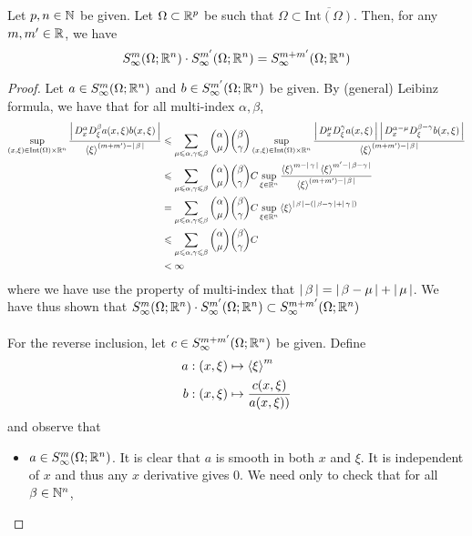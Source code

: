 \documentclass[12pt]{article}
\begin{document}
\begin{fprop}
    Let $p, n \in \N$ be given. Let $\Omega \subset \R^p$ be such that $\Omega \subset \overline{\mathrm{Int}(\Omega)}$. Then, for any $m, m' \in \R$, we have 
    \[
    S^{m}_\infty(\Omega; \R^n) \cdot S^{m'}_\infty(\Omega; \R^n) = S^{m + m'}_\infty(\Omega; \R^n)
    \]
\end{fprop}
\begin{proof}
    Let $a \in S^{m}_\infty(\Omega; \R^n)$ and $b \in S^{m'}_\infty(\Omega; \R^n)$ be given. By (general) Leibinz formula, we have that for all multi-index $\alpha, \beta$, 
    \begin{align*}
    \sup_{(x, \xi) \in \mathrm{Int}(\Omega) \times \R^n} \frac{\abs{D^\alpha_x D^\beta_\xi a(x, \xi)b(x, \xi)}}{\sym[\xi]^{(m + m') - \abs{\beta}}} 
    &\leq  \sum_{\mu \leq \alpha, \gamma \leq \beta} \binom{\alpha}{\mu} \binom{\beta}{\gamma} \sup_{(x, \xi) \in \mathrm{Int}(\Omega) \times \R^n} \frac{\abs{D^\mu_x D^\gamma_\xi a(x, \xi)} \abs{D^{\alpha - \mu}_x D^{\beta - \gamma}_\xi b(x, \xi)}}{\sym[\xi]^{(m + m') - \abs{\beta}}} \\
    &\leq \sum_{\mu \leq \alpha, \gamma \leq \beta} \binom{\alpha}{\mu} \binom{\beta}{\gamma} C \sup_{\xi \in \R^n} \frac{\sym[\xi]^{m - \abs{\gamma}} \sym[\xi]^{m' - \abs{\beta - \gamma}}}{\sym[\xi]^{(m + m') - \abs{\beta}}} \\
    &= \sum_{\mu \leq \alpha, \gamma \leq \beta} \binom{\alpha}{\mu} \binom{\beta}{\gamma} C \sup_{\xi \in \R^n} \sym[\xi]^{\abs{\beta} - (\abs{\beta - \gamma} + \abs{\gamma})} \\
    & \leq \sum_{\mu \leq \alpha, \gamma \leq \beta} \binom{\alpha}{\mu} \binom{\beta}{\gamma} C \\
    &< \infty
    \end{align*}
    where we have use the property of multi-index that $\abs{\beta} = \abs{\beta - \mu} + \abs{\mu}$.  We have thus shown that $S^{m}_\infty(\Omega; \R^n) \cdot S^{m'}_\infty(\Omega; \R^n) \subset S^{m + m'}_\infty(\Omega; \R^n)$\\
    \\
    For the reverse inclusion, let $c \in S^{m + m'}_\infty(\Omega; \R^n)$ be given. Define 
    \begin{align*}
    a : (x, \xi) &\mapsto \sym[\xi]^m\\
    b: (x, \xi) &\mapsto \frac{c(x, \xi)}{a(x, \xi))}
    \end{align*}
    and observe that 
    \begin{itemize}
        \item $a \in S^{m}_\infty(\Omega; \R^n)$. It is clear that $a$ is smooth in both $x$ and $\xi$. It is independent of $x$ and thus any $x$ derivative gives 0. We need only to check that for all $\beta \in \N^n$, 

\end{itemize}
\end{proof}
\end{document}
